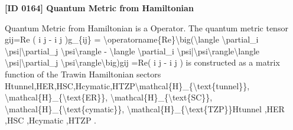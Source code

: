 \clearpage
\noindent\textbf{[ID 0164] Quantum Metric from Hamiltonian}\par
\vspace{0.35em}
\begingroup\small
{}
Quantum Metric from Hamiltonian is a Operator. The quantum metric tensor gij=Re (  i   j  -  i        j  )g\_\{ij\} = \textbackslash{}operatorname\{Re\}\textbackslash{}big(\textbackslash{}langle \textbackslash{}partial\_i \textbackslash{}psi|\textbackslash{}partial\_j \textbackslash{}psi\textbackslash{}rangle - \textbackslash{}langle \textbackslash{}partial\_i \textbackslash{}psi|\textbackslash{}psi\textbackslash{}rangle\textbackslash{}langle \textbackslash{}psi|\textbackslash{}partial\_j \textbackslash{}psi\textbackslash{}rangle\textbackslash{}big)gij =Re(  i    j   -  i         j   ) is constructed as a matrix function of the Trawin Hamiltonian sectors Htunnel,HER,HSC,Hcymatic,HTZP\textbackslash{}mathcal\{H\}\_\{\textbackslash{}text\{tunnel\}\}, \textbackslash{}mathcal\{H\}\_\{\textbackslash{}text\{ER\}\}, \textbackslash{}mathcal\{H\}\_\{\textbackslash{}text\{SC\}\}, \textbackslash{}mathcal\{H\}\_\{\textbackslash{}text\{cymatic\}\}, \textbackslash{}mathcal\{H\}\_\{\textbackslash{}text\{TZP\}\}Htunnel ,HER ,HSC ,Hcymatic ,HTZP .

